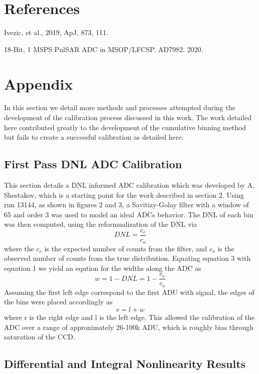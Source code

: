 \documentclass[11pt, letterpaper]{article}
\begin{document}
\section{References}

Ivezic, et al., 2019, ApJ, 873, 111.

18-Bit, 1 MSPS PulSAR ADC in MSOP/LFCSP. AD7982. 2020. 

\section{Appendix}
\indent

In this section we detail more methods and processes attempted during the development of the calibration process discussed in this work. 
The work detailed here contributed greatly to the development of the cumulative binning method but fails to create a successful calibration as detailed here.
\indent

\subsection{First Pass DNL ADC Calibration}
\indent


This section details a DNL informed ADC calibration which was developed by A. Shestakov, which is a starting point for the work described in section 2. 
Using run 13144, as shown in figures 2 and 3, a Savitizy-Golay filter with a window of 65 and order 3 was used to model an ideal ADCs behavior. 
The DNL of each bin was then computed, using the reformualization of the DNL via 
 \begin{equation}
 DNL = \frac{c_e}{c_o}
 \end{equation}
where the $c_{e}$ is the expected number of counts from the filter, and $c_{o}$ is the observed number of counts from the true distribution. 
Equating equation 3 with equation 1 we yield an eqution for the widths along the ADC as
 \begin{equation}
 w = 1-DNL = 1- \frac{c_e}{c_o}
 \end{equation}
Assuming the first left edge correspond to the first ADU with signal, the edges of the bins were placed accordingly as
 \begin{equation}
r = l + w 
\end{equation}
where r is the right edge and l is the left edge. 
This allowed the calibration of the ADC over a range of approximately 26-100k ADU, which is roughly bias through saturation of the CCD.  


\subsection{Differential and Integral Nonlinearity Results}
\indent
\end{document}
